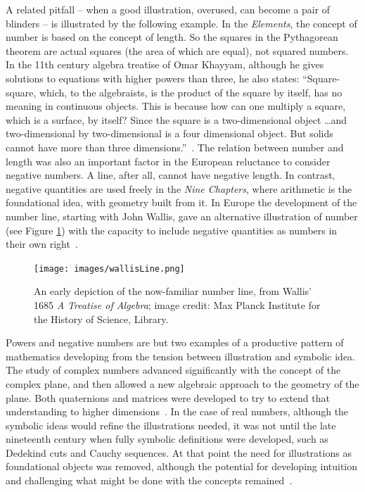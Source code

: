 \documentclass{notices}
\begin{document}
A related pitfall -- when a good illustration, overused, can become a pair of blinders -- is illustrated by the following example.
In the \emph{Elements}, the concept of number is based on the concept of length. So the squares in the Pythagorean theorem are actual squares (the area of which are equal), not squared numbers. In the 11th century algebra treatise of Omar Khayyam, although he gives solutions to equations with higher powers than three, he also states: ``Square-square, which, to the algebraists, is the product of the square by itself, has no meaning in continuous objects. This is because how can one multiply a square, which is a surface, by itself? Since the square is a two-dimensional object \ldots\@ and two-dimensional by two-dimensional is a four dimensional object. But solids cannot have more than three dimensions.''~\cite{Khayyam:AOK}. The relation between number and length was also an important factor in the European reluctance to consider negative numbers. A line, after all, cannot have negative length. In contrast, negative quantities are used freely in the \emph{Nine Chapters}, where arithmetic is the foundational idea, with geometry built from it. In Europe the development of the number line, starting with John Wallis, gave an alternative illustration of number (see Figure \ref{fig:wallisLine}) with the capacity to include negative quantities as numbers in their own right~\cite{Schubring:CBGRI}.
\begin{figure}
    \texttt{[image: images/wallisLine.png]}
    \caption{An early depiction of the now-familiar number line, from Wallis' 1685 \emph{A Treatise of Algebra}; image credit: Max Planck Institute for the History of Science, Library.}
    \label{fig:wallisLine}
\end{figure}

Powers and negative numbers are but two examples of a productive pattern of mathematics developing from the tension between illustration and symbolic idea. The study of complex numbers advanced significantly with the concept of the complex plane, and then allowed a new algebraic approach to the geometry of the plane. Both quaternions and matrices were developed to try to extend that understanding to higher dimensions~\cites{Knott:HVM,Grattan-Guiness:MT}. 
In the case of real numbers, although the symbolic ideas would refine the illustrations needed, it was not until the late nineteenth century when fully symbolic definitions were developed, such as Dedekind cuts and Cauchy sequences. At that point the need for illustrations as foundational objects was removed, although the potential for developing intuition and challenging what might be done with the concepts remained~\cite{Fowler:DT}. 
\end{document}
